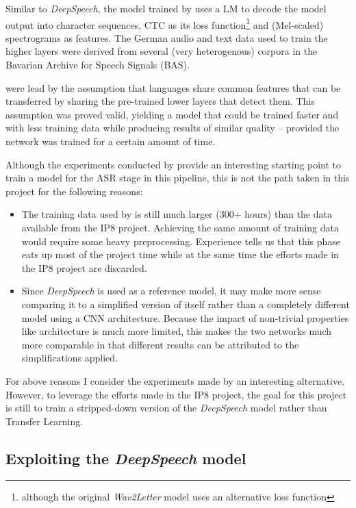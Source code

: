 Similar to \textit{DeepSpeech}, the model trained by \cite{budget} uses a \ac{LM} to decode the model output into character sequences, \ac{CTC} as its loss function\footnote{although the original \textit{Wav2Letter} model uses an alternative loss function} and (Mel-scaled) spectrograms as features. The German audio and text data used to train the higher layers were derived from several (very heterogenous) corpora in the Bavarian Archive for Speech Signals (BAS). 

\cite{budget} were lead by the assumption that languages share common features that can be transferred by sharing the pre-trained lower layers that detect them. This assumption was proved valid, yielding a model that could be trained faster and with less training data while producing results of similar quality -- provided the network was trained for a certain amount of time.

Although the experiments conducted by \cite{budget} provide an interesting starting point to train a model for the \ac{ASR} stage in this pipeline, this is not the path taken in this project for the following reasons:

\begin{itemize}
	\item The training data used by \cite{budget} is still much larger (300+ hours) than the data available from the IP8 project. Achieving the same amount of training data would require some heavy preprocessing. Experience tells us that this phase eats up most of the project time while at the same time the efforts made in the IP8 project are discarded.
	\item Since \textit{DeepSpeech} is used as a reference model, it may make more sense comparing it to a simplified version of itself rather than a completely different model using a \ac{CNN} architecture. Because the impact of non-trivial properties like architecture is much more limited, this makes the two networks much more comparable in that different results can be attributed to the simplifications applied.
\end{itemize}

For above reasons I consider the experiments made by \cite{budget} an interesting alternative. However, to leverage the efforts made in the IP8 project, the goal for this project is still to train a stripped-down version of the \textit{DeepSpeech} model rather than Transfer Learning.

\subsection{Exploiting the \textit{DeepSpeech} model}

